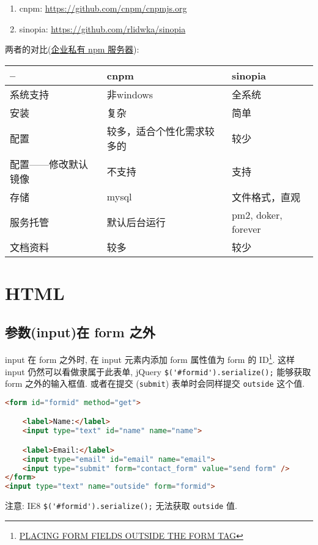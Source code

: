 \begin{enumerate}
\def\labelenumi{\arabic{enumi}.}
\tightlist
\item
  cnpm: \url{https://github.com/cnpm/cnpmjs.org}
\item
  sinopia: \url{https://github.com/rlidwka/sinopia}
\end{enumerate}

两者的对比(\href{https://www.jianshu.com/p/659fb418c9e3}{企业私有 npm
服务器}):

\begin{longtable}[]{@{}lll@{}}
\toprule
-- & cnpm & sinopia\tabularnewline
\midrule
\endhead
系统支持 & 非windows & 全系统\tabularnewline
安装 & 复杂 & 简单\tabularnewline
配置 & 较多，适合个性化需求较多的 & 较少\tabularnewline
配置------修改默认镜像 & 不支持 & 支持\tabularnewline
存储 & mysql & 文件格式，直观\tabularnewline
服务托管 & 默认后台运行 & pm2, doker, forever\tabularnewline
文档资料 & 较多 & 较少\tabularnewline
\bottomrule
\end{longtable}

\section{HTML}\label{html}

\subsection{参数(input)在 form
之外}\label{ux53c2ux6570inputux5728-form-ux4e4bux5916}

input 在 form 之外时, 在 input 元素内添加 form 属性值为 form 的
ID\footnote{\href{http://www.dreamdealer.nl/articles/form_fields_outside_a_form.html}{PLACING
  FORM FIELDS OUTSIDE THE FORM TAG}}. 这样 input
仍然可以看做隶属于此表单, jQuery \lstinline!$('#formid').serialize();!
能够获取 form 之外的输入框值. 或者在提交 (\lstinline!submit!)
表单时会同样提交 \lstinline!outside! 这个值.

\begin{lstlisting}[language=HTML]
<form id="formid" method="get">

    <label>Name:</label>
    <input type="text" id="name" name="name">

    <label>Email:</label>
    <input type="email" id="email" name="email">
    <input type="submit" form="contact_form" value="send form" />
</form>
<input type="text" name="outside" form="formid">
\end{lstlisting}

注意: IE8 \lstinline!$('#formid').serialize();! 无法获取
\lstinline!outside! 值.

